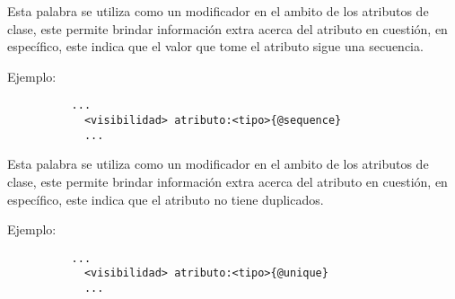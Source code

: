 \begin{description}[align=right,labelwidth=2.5cm]
\item [@sequence] Esta palabra se utiliza como un modificador en el ambito de
	los atributos de clase, este permite brindar información extra acerca del
	atributo en cuestión, en específico, este indica que el valor que tome el
	atributo sigue una secuencia.

	Ejemplo:
		\begin{lstlisting}
		  ...
			<visibilidad> atributo:<tipo>{@sequence}
			...
		\end{lstlisting}

\item [@unique] Esta palabra se utiliza como un modificador en el ambito de
	los atributos de clase, este permite brindar información extra acerca del
	atributo en cuestión, en específico, este indica que el atributo no tiene
	duplicados.

	Ejemplo:
		\begin{lstlisting}
		  ...
			<visibilidad> atributo:<tipo>{@unique}
			...
		\end{lstlisting}

\end{description}
